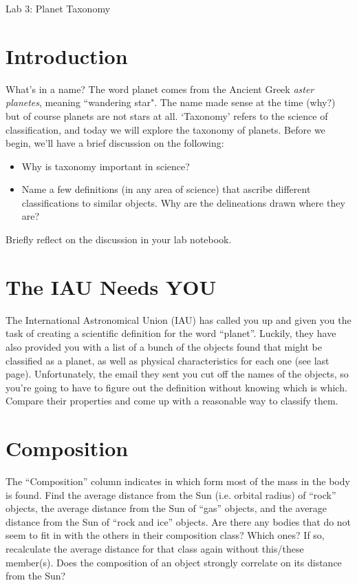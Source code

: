 \documentclass[12pt]{article}
\begin{document}
 \begin{center}
{\huge Lab 3: Planet Taxonomy}\\
\end{center} 


\section*{Introduction}

What's in a name? The word planet comes from the Ancient Greek \textit{aster planetes}, meaning ``wandering star". The name made sense at the time (why?) but of course planets are not stars at all. `Taxonomy' refers to the science of classification, and today we will explore the taxonomy of planets. Before we begin, we'll have a brief discussion on the following:

\begin{itemize}
\item{Why is taxonomy important in science?}
\item{Name a few definitions (in any area of science) that ascribe different classifications to similar objects. Why are the delineations drawn where they are?}
\end{itemize}

\noindent Briefly reflect on the discussion in your lab notebook.

\section*{The IAU Needs YOU}
The International Astronomical Union (IAU) has called you up and given you the task of creating a scientific definition for the word ``planet''. Luckily, they have also provided you with a list of a bunch of the objects found that might be classified as a planet, as well as physical characteristics for each one (see last page). Unfortunately, the email they sent you cut off the names of the objects, so you're going to have to figure out the definition without knowing which is which. Compare their properties and come up with a reasonable way to classify them.

\section*{Composition}
The ``Composition'' column indicates in which form most of the mass in the body is found.  Find the average distance from the Sun (i.e. orbital radius) of ``rock'' objects, the average distance from the Sun of ``gas'' objects, and the average distance from the Sun of ``rock and ice'' objects. Are there any bodies that do not seem to fit in with the others in their composition class? Which ones? If so, recalculate the average distance for that class again without this/these member(s).  Does the composition of an object strongly correlate on its distance from the Sun? 
\end{document}
